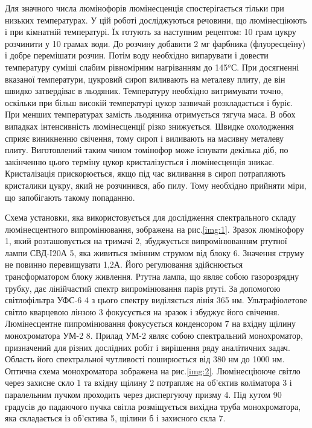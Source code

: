 \documentclass[twocolumn]{el-author}
\begin{document}
Для значного числа люмінофорів люмінесценція спостерігається тільки
при низьких температурах. У цій роботі досліджуються речовини, що
люмінесціюють і при кімнатній температурі. Їх готують за наступним
рецептом:
10 грам цукру розчинити у 10 грамах води. До розчину добавити 2 мг
фарбника (флуоресцеїну) і добре перемішати розчин. Потім воду необхідно
випарувати і довести температуру суміші слабим рівномірним нагріванням
до 145$^{o}$С. При досягненні вказаної температури, цукровий сироп виливають
на металеву плиту, де він швидко затвердіває в льодяник. Температуру
необхідно витримувати точно, оскільки при більш високій температурі цукор
зазвичай розкладається і буріє. При менших температурах замість льодяника
отримується тягуча маса. В обох випадках інтенсивність люмінесценції різко
знижується. Швидке охолодження сприяє виникненню свічення, тому сироп і
виливають на масивну металеву плиту. Виготовлений таким чином
томінофор може існувати декілька діб, по закінченню цього терміну цукор
кристалізується і люмінесценція зникає. Кристалізація прискорюється, якщо
під час виливання в сироп потрапляють кристалики цукру, який не
розчинився, або пилу. Тому необхідно прийняти міри, що запобігають такому
попаданню.

Схема установки, яка використовується для дослідження
спектрального складу люмінесцентного випромінювання, зображена на
рис.\ref{img:1}. Зразок люмінофору 1, який розташовується на тримачі 2,
збуджується випромінюванням ртутної лампи СВД-І20А 5, яка живиться
змінним струмом від блоку 6. Значення струму не повинно перевищувати 1,2А. 
Його регулювання здійснюється трансформатором блоку живлення.
Ртутна лампа, що являє собою газорозрядну трубку, дає лінійчастий спектр
випромінювання парів ртуті. За допомогою світлофільтра УФС-6 4 з цього
спектру виділяється лінія 365 нм. Ультрафіолетове світло кварцевою лінзою
3 фокусується на зразок і збуджує його свічення. Люмінесцентне
пипромінювання фокусується  конденсором 7 на вхідну щілину
монохроматора УМ-2 8. Прилад УМ-2 являє собою спектральний
монохроматор, призначений для різних дослідних робіт і вирішення ряду
аналітичних задач. Область його спектральної чутливості поширюється від
380 нм до 1000 нм. Оптична схема монохроматора зображена на рис.\ref{img:2}.
Люмінесціююче світло через захисне скло 1 та вхідну щілину 2 потрапляє на
об'єктив коліматора 3 і паралельним пучком проходить через диспергуючу
призму 4. Під кутом 90 градусів до падаючого пучка світла розміщується
вихідна труба монохроматора, яка складається із об'єктива 5, щілини б і
захисного скла 7.
\end{document}
